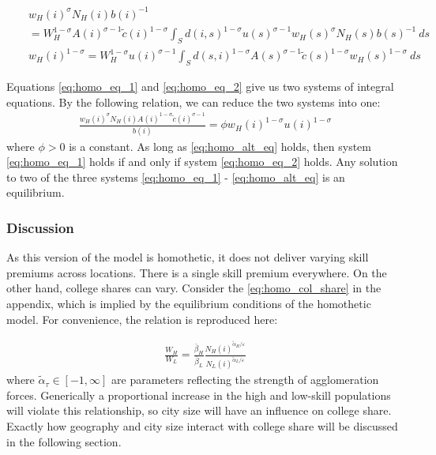 \documentclass{article}
\begin{document}
\begin{eqnarray}
    \label{eq:homo_eq_1}
	& & w_H(i)^{\sigma} N_H(i) b(i)^{-1} \nonumber \\
	& & =  
	W_H^{1-\sigma} A(i)^{\sigma-1} \tilde{c}(i)^{1-\sigma}
	\int_S d(i,s)^{1-\sigma} u(s)^{\sigma-1} w_H(s)^{\sigma} N_H(s) b(s)^{-1}  ~ds \\
    \label{eq:homo_eq_2}
 	& & w_H(i)^{1-\sigma} =  W_H^{1-\sigma} u(i)^{\sigma-1} 
 	\int_S  d(s,i)^{1-\sigma} A(s)^{\sigma-1}  \tilde{c}(s)^{1-\sigma} w_H(s)^{1-\sigma}
 	~ ds
\end{eqnarray}

Equations \eqref{eq:homo_eq_1} and \eqref{eq:homo_eq_2} give us two systems of integral equations. By the following relation, we can reduce the two systems into one: 
\begin{eqnarray}
    \label{eq:homo_alt_eq}
	\frac{w_H(i)^{\sigma}N_H(i)A(i)^{1-\sigma}\tilde{c}(i)^{\sigma-1}}{b(i)} = \phi w_H(i)^{1-\sigma} u(i)^{1-\sigma}
\end{eqnarray}
where $\phi > 0$ is a constant. As long as \eqref{eq:homo_alt_eq} holds, then system \eqref{eq:homo_eq_1} holds if and only if system \eqref{eq:homo_eq_2} holds. Any solution to two of the three systems \eqref{eq:homo_eq_1} - \eqref{eq:homo_alt_eq} is an equilibrium.

\subsubsection{Discussion}

As this version of the model is homothetic, it does not deliver varying skill premiums across locations.  There is a single skill premium everywhere.  On the other hand, college shares can vary.  Consider the \eqref{eq:homo_col_share} in the appendix, which is implied by the equilibrium conditions of the homothetic model.  For convenience, the relation is reproduced here:

\begin{eqnarray}
	\frac{W_H}{W_L} = \frac{\bar{\beta}_H}{\bar{\beta}_L} \frac{N_H(i)^{\tilde{\alpha}_H /\varepsilon}}{N_L(i)^{\tilde{\alpha}_L/\varepsilon}} \nonumber
\end{eqnarray}
where $\tilde{\alpha}_\tau \in [-1,\infty]$ are parameters reflecting the strength of agglomeration forces.  Generically a proportional increase in the high and low-skill populations will violate this relationship, so city size will have an influence on college share.  Exactly how geography and city size interact with college share will be discussed in the following section.
\end{document}
